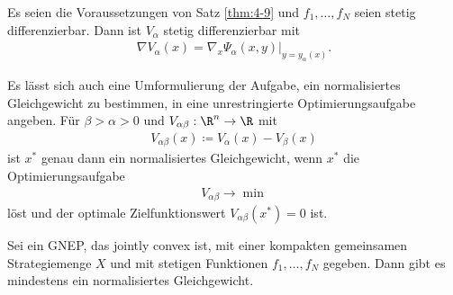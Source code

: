\begin{satz}\label{thm:4-11}
  Es seien die Voraussetzungen von Satz \ref{thm:4-9} und $f_{1}, \dots, f_{N}$ seien stetig differenzierbar. Dann ist $V_{\alpha}$ stetig differenzierbar mit
  \begin{align*}
    \nabla V_{\alpha}(x) = \left.\nabla_{x}\Psi_{\alpha}(x, y)\right|_{y = y_{\alpha}(x)}. 
  \end{align*}
\end{satz}
Es lässt sich auch eine Umformulierung der Aufgabe, ein normalisiertes Gleichgewicht zu bestimmen, in eine unrestringierte Optimierungsaufgabe angeben.  Für $\beta >\alpha > 0$ und $V_{\alpha\beta}: \R^{n} \to \R$ mit
\begin{align*}
  V_{\alpha\beta}(x) \coloneqq V_{\alpha}(x) - V_{\beta}(x)
\end{align*}
ist $x^{*}$ genau dann ein normalisiertes Gleichgewicht, wenn $x^{*}$ die Optimierungsaufgabe
\begin{align*}
  V_{\alpha\beta} \to \min
\end{align*}
löst und der optimale Zielfunktionswert $V_{\alpha\beta}(x^{*}) = 0$ ist. 
\begin{satz}\label{thm:4-12}
  Sei ein GNEP, das jointly convex ist, mit einer kompakten gemeinsamen Strategiemenge $X$ und mit stetigen Funktionen $f_{1}, \dots, f_{N}$ gegeben. Dann gibt es mindestens ein normalisiertes Gleichgewicht. 
\end{satz}


